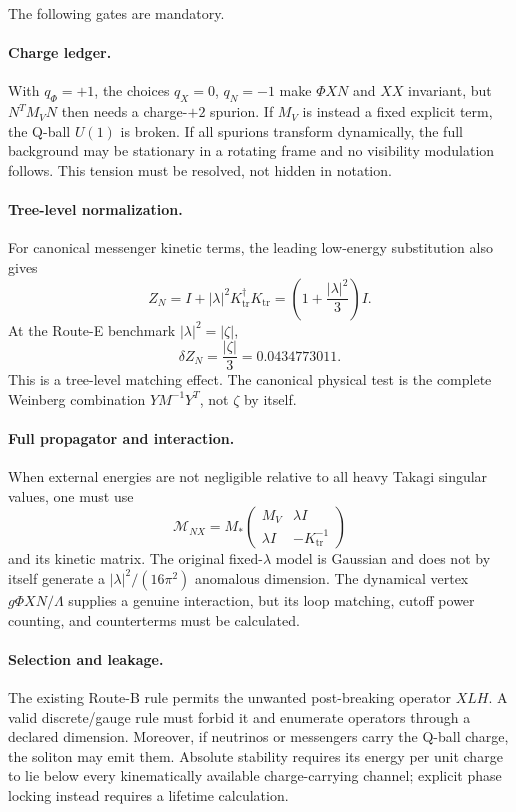\documentclass[11pt]{article}
\numberwithin{equation}{section}
\newcommand{\Ktr}{K_{\mathrm{tr}}}
\begin{document}
The following gates are mandatory.

\paragraph{Charge ledger.}
With \(q_\Phi=+1\), the choices \(q_X=0\), \(q_N=-1\) make \(\Phi XN\) and
\(XX\) invariant, but \(N^TM_VN\) then needs a charge-\(+2\) spurion.  If
\(M_V\) is instead a fixed explicit term, the Q-ball \(U(1)\) is broken.  If
all spurions transform dynamically, the full background may be stationary in
a rotating frame and no visibility modulation follows.  This tension must be
resolved, not hidden in notation.

\paragraph{Tree-level normalization.}
For canonical messenger kinetic terms, the leading low-energy substitution
also gives
\begin{equation}
 Z_N=I+|\lambda|^2\Ktr^\dagger\Ktr
 =\left(1+\frac{|\lambda|^2}{3}\right)I.
 \label{eq:ZN}
\end{equation}
At the Route-E benchmark \(|\lambda|^2=|\zeta|\),
\begin{equation}
 \delta Z_N=\frac{|\zeta|}{3}=0.0434773011.
\end{equation}
This is a tree-level matching effect.  The canonical physical test is the
complete Weinberg combination \(Y M^{-1}Y^T\), not \(\zeta\) by itself.

\paragraph{Full propagator and interaction.}
When external energies are not negligible relative to all heavy Takagi
singular values, one must use
\begin{equation}
 \mathcal M_{NX}=M_*
 \begin{pmatrix}M_V&\lambda I\\ \lambda I&-\Ktr^{-1}\end{pmatrix}
 \label{eq:6x6}
\end{equation}
and its kinetic matrix.  The original fixed-\(\lambda\) model is Gaussian and
does not by itself generate a \(|\lambda|^2/(16\pi^2)\) anomalous dimension.
The dynamical vertex \(g\Phi XN/\Lambda\) supplies a genuine interaction, but
its loop matching, cutoff power counting, and counterterms must be calculated.

\paragraph{Selection and leakage.}
The existing Route-B rule permits the unwanted post-breaking operator
\(XLH\).  A valid discrete/gauge rule must forbid it and enumerate operators
through a declared dimension.  Moreover, if neutrinos or messengers carry the
Q-ball charge, the soliton may emit them.  Absolute stability requires its
energy per unit charge to lie below every kinematically available
charge-carrying channel; explicit phase locking instead requires a lifetime
calculation.
\end{document}
